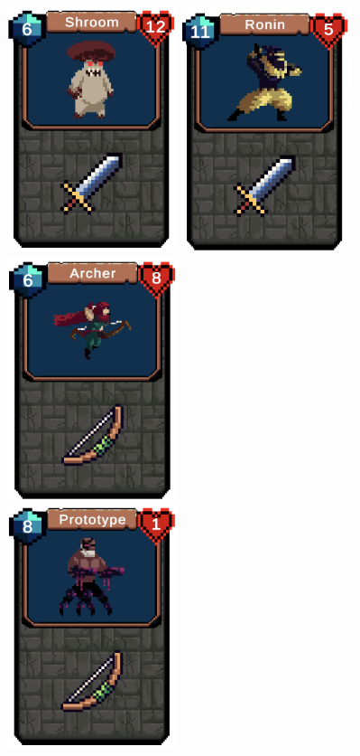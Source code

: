 \begin{itemize}
        \includegraphics[width=5cm]{resources/Mushroom.png}
        \includegraphics[width=5cm]{resources/Ronin.png}
        \includegraphics[width=5cm]{resources/Archer.png} \\
        \includegraphics[width=5cm]{resources/Prototype.png} \\

\end{itemize}
